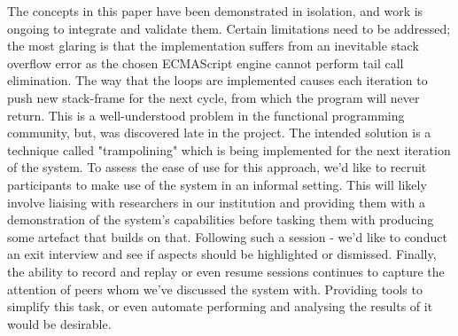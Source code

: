 The concepts in this paper have been demonstrated in isolation, and work is ongoing to integrate and validate them.
  Certain limitations need to be addressed; the most glaring is that the implementation suffers from an inevitable stack overflow error as the chosen ECMAScript engine cannot perform tail call elimination.
    The way that the loops are implemented causes each iteration to push new stack-frame for the next cycle, from which the program will never return.
    This is a well-understood problem in the functional programming community, but, was discovered late in the project.
    The intended solution is a technique called "trampolining" which is being implemented for the next iteration of the system.
  To assess the ease of use for this approach, we'd like to recruit participants to make use of the system in an informal setting.
    This will likely involve liaising with researchers in our institution and providing them with a demonstration of the system's capabilities before tasking them with producing some artefact that builds on that.
    Following such a session - we'd like to conduct an exit interview and see if aspects should be highlighted or dismissed.
  Finally, the ability to record and replay or even resume sessions continues to capture the attention of peers whom we've discussed the system with.
    Providing tools to simplify this task, or even automate performing and analysing the results of it would be desirable.

